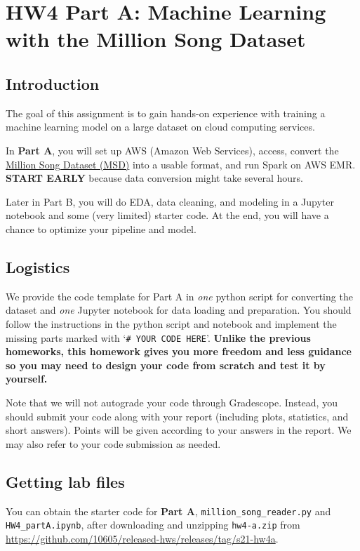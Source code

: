 \setlength{\arrayrulewidth}{0.3mm}
\renewcommand{\arraystretch}{2.0}

\section{HW4 Part A: Machine Learning with the Million Song Dataset}
\subsection{Introduction}
The goal of this assignment is to gain hands-on experience with training a machine learning model on a large dataset on cloud computing services.

In \textbf{Part A}, you will set up AWS (Amazon Web Services), access, convert the \href{http://millionsongdataset.com/}{Million Song Dataset (MSD)} into a usable format, and run Spark on AWS EMR.  \textbf{START EARLY} because data conversion might take several hours.

Later in Part B, you will do EDA, data cleaning, and modeling in a Jupyter notebook and some (very limited) starter code. At the end, you will have a chance to optimize your pipeline and model. 


\subsection{Logistics}
We provide the code template for Part A in \textit{one} python script for converting the dataset and \textit{one} Jupyter notebook for data loading and preparation. You should follow the instructions in the python script and notebook and implement the missing parts marked with `\texttt{\# YOUR CODE HERE}'. \textbf{Unlike the previous homeworks, this homework gives you more freedom and less guidance so you may need to design your code from scratch and test it by yourself.} 

Note that we will not autograde your code through Gradescope. Instead,  you should submit your code along with your report (including plots, statistics, and short answers). Points will be given according to your answers in the report. We may also refer to your code submission as needed.


\subsection{Getting lab files}
You can obtain the starter code for \textbf{Part A},  \texttt{million\_song\_reader.py} and \texttt{HW4\_partA.ipynb}, after downloading and unzipping \texttt{hw4-a.zip} from \href{https://github.com/10605/released-hws/releases/tag/s21-hw4a}{https://github.com/10605/released-hws/releases/tag/s21-hw4a}.



